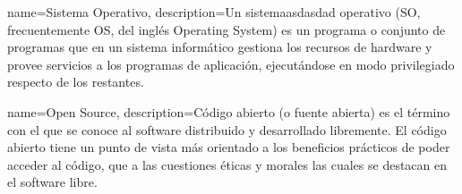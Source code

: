 



{name=Sistema Operativo,
 description={Un sistemaasdasdad operativo (SO, frecuentemente OS, del inglés Operating System) es un programa o conjunto de programas que en un sistema informático gestiona los recursos de hardware y provee servicios a los programas de aplicación, ejecutándose en modo privilegiado respecto de los restantes.}
 }

{name=Open Source,
 description={Código abierto (o fuente abierta) es el término con el que se conoce al software distribuido y desarrollado libremente. El código abierto tiene un punto de vista más orientado a los beneficios prácticos de poder acceder al código, que a las cuestiones éticas y morales las cuales se destacan en el software libre.}
 }

